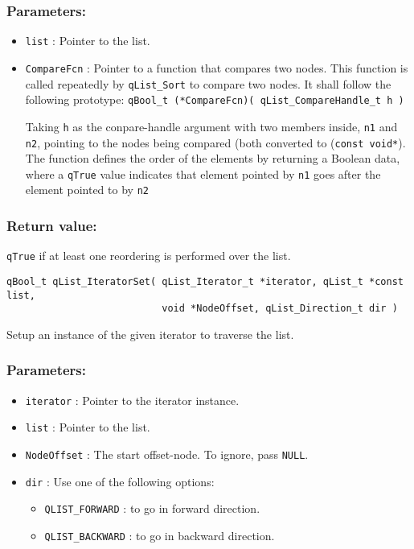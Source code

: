 \subsubsection*{Parameters:}
\begin{itemize}
    \item \lstinline{list} : Pointer to the list. 
    \item \lstinline{CompareFcn} : Pointer to a function that compares two nodes.
                    This function is called repeatedly by \lstinline{qList_Sort} to compare two nodes. It shall follow the following prototype:
                    \lstinline{qBool_t (*CompareFcn)( qList_CompareHandle_t h )}
                    
                    Taking \lstinline{h} as the conpare-handle argument with two members inside, \lstinline{n1} and \lstinline{n2}, pointing to the nodes being compared (both converted to (\lstinline{const void*}). The function defines the order of the elements by returning a Boolean data, where a \lstinline{qTrue} value indicates that element pointed by \lstinline{n1} goes after the element pointed to by \lstinline{n2}
\end{itemize}

\subsubsection*{Return value:}
\lstinline{qTrue} if at least one reordering is performed over the list. 


\noindent\hrulefill

\begin{lstlisting}[style=CStyle]
qBool_t qList_IteratorSet( qList_Iterator_t *iterator, qList_t *const list, 
                           void *NodeOffset, qList_Direction_t dir )
\end{lstlisting} 

Setup an instance of the given iterator to traverse the list.

\subsubsection*{Parameters:}
\begin{itemize}
    \item \lstinline{iterator} : Pointer to the iterator instance. 
    \item \lstinline{list} : Pointer to the list.
    \item \lstinline{NodeOffset} : The start offset-node. To ignore, pass \lstinline{NULL}.
    \item \lstinline{dir} : Use one of the following options:
        \begin{itemize}
            \item \lstinline{QLIST_FORWARD} : to go in forward direction.
            \item \lstinline{QLIST_BACKWARD} : to go in backward direction.
        \end{itemize}
\end{itemize}

